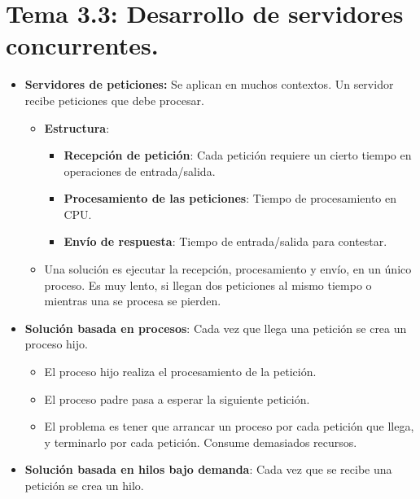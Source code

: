 \documentclass[12pt, twoside, openright]{report} %
\begin{document}
  \section{Tema 3.3: Desarrollo de servidores concurrentes.}

  \begin{itemize}
  \item \textbf{Servidores de peticiones:} Se aplican en muchos contextos.
    Un servidor recibe peticiones que debe procesar.
    

    \begin{itemize}
    \item \textbf{Estructura}:
      

      \begin{itemize}
      \item \textbf{Recepción de petición}: Cada petición requiere un cierto
        tiempo en operaciones de entrada/salida.
        
      \item \textbf{Procesamiento de las peticiones}: Tiempo de
        procesamiento en CPU.
        
      \item \textbf{Envío de respuesta}: Tiempo de entrada/salida para
        contestar.
        
      \end{itemize}
    \item Una solución es ejecutar la recepción, procesamiento y envío, en
      un único proceso. Es muy lento, si llegan dos peticiones al mismo
      tiempo o mientras una se procesa se pierden.
      
    \end{itemize}
	\pagebreak
  \item \textbf{Solución basada en procesos}: Cada vez que llega una
    petición se crea un proceso hijo.
    

    \begin{itemize}
    \item El proceso hijo realiza el procesamiento de la petición.
      
    \item El proceso padre pasa a esperar la siguiente petición.
      
    \item El problema es tener que arrancar un proceso por cada petición que
      llega, y terminarlo por cada petición. Consume demasiados
      recursos.
      
    \end{itemize}
  \item \textbf{Solución basada en hilos bajo demanda}: Cada vez que se
    recibe una petición se crea un hilo.
    


\end{itemize}
\end{document}
